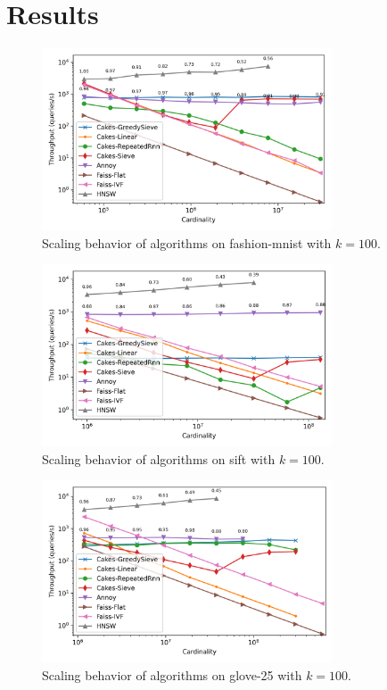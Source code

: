 \documentclass{article}
\begin{document}
\renewcommand{\thetable}{S\arabic{table}}

\renewcommand{\thefigure}{S\arabic{figure}}

\section{Results}

\begin{figure}[ht!]
    \centering
    \includegraphics[width=3.4in]{plots/fashion-mnist-knn-100.png}
    \caption{
        Scaling behavior of algorithms on fashion-mnist with $k=100$. 
    }
    \label{fig:supplement:fashion-mnist-k-100}
\end{figure}

\begin{figure}[ht!]
    \centering
    \includegraphics[width=3.4in]{plots/sift-knn-100.png}
    \caption{
        Scaling behavior of algorithms on sift with $k=100$. 
    }
    \label{fig:supplement:sift-k-100}
\end{figure}

\begin{figure}[ht!]
    \centering
    \includegraphics[width=3.4in]{plots/glove-25-knn-100.png}
    \caption{
        Scaling behavior of algorithms on glove-25 with $k=100$. 
    }
    \label{fig:supplement:glove-25-k-100}
\end{figure}
\end{document}
